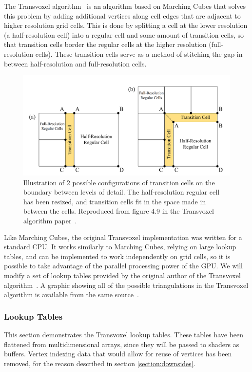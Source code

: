 \documentclass[11pt]{article}
\begin{document}
The Transvoxel algorithm~\cite{lengyel_2010} is an algorithm based on Marching Cubes that solves this problem by adding additional vertices along cell edges that are adjacent to higher resolution grid cells. This is done by splitting a cell at the lower resolution (a half-resolution cell) into a regular cell and some amount of transition cells, so that transition cells border the regular cells at the higher resolution (full-resolution cells). These transition cells serve as a method of stitching the gap in between half-resolution and full-resolution cells.
\begin{figure}[H]
  \includegraphics[width=\textwidth]{transition_cells}
  \caption{Illustration of 2 possible configurations of transition cells on the boundary between levels of detail. The half-resolution regular cell has been resized, and transition cells fit in the space made in between the cells. Reproduced from figure 4.9 in the Transvoxel algorithm paper~\cite{lengyel_2010}.}
  \label{fig:transition_cells}
\end{figure}

Like Marching Cubes, the original Transvoxel implementation was written for a standard CPU. It works similarly to Marching Cubes, relying on large lookup tables, and can be implemented to work independently on grid cells, so it is possible to take advantage of the parallel processing power of the GPU. We will modify a set of lookup tables provided by the original author of the Transvoxel algorithm~\cite{lengyel_2009}. A graphic showing all of the possible triangulations in the Transvoxel algorithm is available from the same source~\cite{lengyel}.

\subsubsection{Lookup Tables}
\label{section:lookup_tables}

This section demonstrates the Transvoxel lookup tables. These tables have been flattened from multidimensional arrays, since they will be passed to shaders as buffers. Vertex indexing data that would allow for reuse of vertices has been removed, for the reason described in section \ref{section:downsides}.
\end{document}
